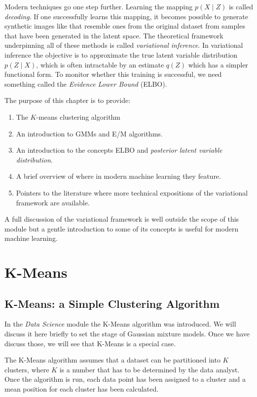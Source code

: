 Modern techniques go one step further.
Learning the mapping $p(X \mid Z)$ is called \emph{decoding}. If one successfully learns this mapping,
it becomes possible to generate synthetic images like that resemble ones from the original dataset
from samples that have been generated in the latent space.
The theoretical framework underpinning all of these methods is called \emph{variational inference}. In variational inference the objective
is to approximate the true latent variable distribution $p(Z \mid X)$, which is often intractable  by an estimate $q(Z)$ which
has a simpler functional form.
To monitor whether this training is successful, we need something called the \emph{Evidence Lower Bound} (ELBO).

The purpose of this chapter is to provide:
\begin{enumerate}
\item The $K$-means clustering algorithm
\item An introduction to GMMs and E/M algorithms.
\item An introduction to the concepts ELBO and \emph{posterior latent variable distribution}.
\item A brief overview of where in modern machine learning they feature.
\item Pointers to the literature where more technical expositions of the variational framework are available.
\end{enumerate}
A full discussion of the variational framework is well outside the scope of this module but a gentle introduction to some of its concepts is useful for
modern machine learning.



\chapter{K-Means}
\section{K-Means: a Simple Clustering Algorithm}
In the \emph{Data Science} module the K-Means algorithm was introduced. We will discuss it here briefly to
set the stage of Gaussian mixture models. Once we have discuss those, we will see that K-Means is a special case.

The K-Means algorithm assumes that  a dataset can be partitioned into $K$ clusters, where $K$ is a number that
has to be determined by the data analyst. Once the algorithm is run, each data point has been assigned to a cluster
and a mean position for each cluster has been calculated.

